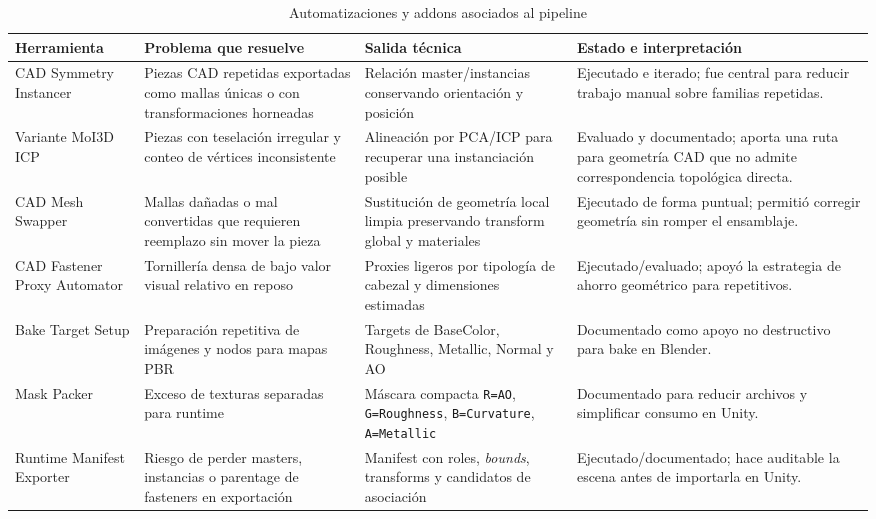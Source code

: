 \begin{table}[p]
    \caption{Automatizaciones y addons asociados al pipeline}
    \label{tab:addons_automatizacion_pipeline}
    \centering
    \footnotesize
    \setlength{\tabcolsep}{3pt}
    \renewcommand{\arraystretch}{0.72}
    \begin{tabular}{>{\RaggedRight\arraybackslash}p{2.65cm}>{\RaggedRight\arraybackslash}p{3.2cm}>{\RaggedRight\arraybackslash}p{2.75cm}>{\RaggedRight\arraybackslash}p{4.75cm}}
        \hline
        \textbf{Herramienta} & \textbf{Problema que resuelve} & \textbf{Salida técnica} & \textbf{Estado e interpretación} \\ \hline
        CAD Symmetry Instancer & Piezas CAD repetidas exportadas como mallas únicas o con transformaciones horneadas & Relación master/instancias conservando orientación y posición & Ejecutado e iterado; fue central para reducir trabajo manual sobre familias repetidas. \\
        Variante MoI3D ICP & Piezas con teselación irregular y conteo de vértices inconsistente & Alineación por PCA/ICP para recuperar una instanciación posible & Evaluado y documentado; aporta una ruta para geometría CAD que no admite correspondencia topológica directa. \\
        CAD Mesh Swapper & Mallas dañadas o mal convertidas que requieren reemplazo sin mover la pieza & Sustitución de geometría local limpia preservando transform global y materiales & Ejecutado de forma puntual; permitió corregir geometría sin romper el ensamblaje. \\
        CAD Fastener Proxy Automator & Tornillería densa de bajo valor visual relativo en reposo & Proxies ligeros por tipología de cabezal y dimensiones estimadas & Ejecutado/evaluado; apoyó la estrategia de ahorro geométrico para repetitivos. \\
        Bake Target Setup & Preparación repetitiva de imágenes y nodos para mapas PBR & Targets de BaseColor, Roughness, Metallic, Normal y AO & Documentado como apoyo no destructivo para bake en Blender. \\
        Mask Packer & Exceso de texturas separadas para runtime & Máscara compacta \texttt{R=AO}, \texttt{G=Roughness}, \texttt{B=Curvature}, \texttt{A=Metallic} & Documentado para reducir archivos y simplificar consumo en Unity. \\
        Runtime Manifest Exporter & Riesgo de perder masters, instancias o parentage de fasteners en exportación & Manifest con roles, \textit{bounds}, transforms y candidatos de asociación & Ejecutado/documentado; hace auditable la escena antes de importarla en Unity. \\ \hline
    \end{tabular}
    \par\vspace{0.5\baselineskip}
\end{table}

